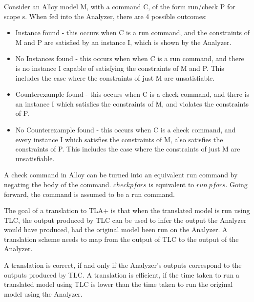 Consider an Alloy model M, with a command C, of the form run/check P for scope s. When fed into the Analyzer, there are 4 possible outcomes:

\begin{itemize}
  \item Instance found - this occurs when C is a run command, and the constraints of M and P are satisfied by an instance I, which is shown by the Analyzer.
  \item No Instances found - this occurs when when C is a run command, and there is no instance I capable of satisfying the constraints of M and P. This includes the case where the constraints of just M are unsatisfiable. 
  \item Counterexample found - this occurs when C is a check command, and there is an instance I which satisfies the constraints of M, and violates the constraints of P.
  \item No Counterexample found - this occurs when C is a check command, and every instance I which satisfies the constraints of M, also satisfies the constraints of P. This includes the case where the constraints of just M are unsatisfiable. 
\end{itemize}

A check command in Alloy can be turned into an equivalent run command by negating the body of the command. $check p for s$ is equivalent to $run ~p for s$. Going forward, the command is assumed to be a run command.

The goal of a translation to TLA+ is that when the translated model is run using TLC, the output produced by TLC can be used to infer the output the Analyzer would have produced, had the original model been run on the Analyzer. A translation scheme needs to map from the output of TLC to the output of the Analyzer.

A translation is correct, if and only if the Analyzer's outputs correspond to the outputs produced by TLC. A translation is efficient, if the time taken to run a translated model using TLC is lower than the time taken to run the original model using the Analyzer.